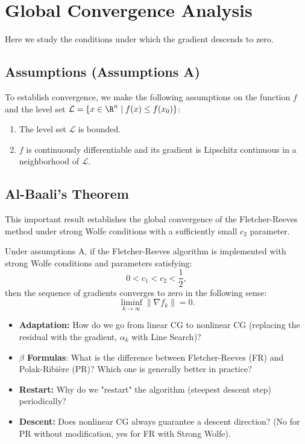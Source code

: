 \section{Global Convergence Analysis}

Here we study the conditions under which the gradient descends to zero.

\subsection{Assumptions (Assumptions A)}
To establish convergence, we make the following assumptions on the function $f$ and the level set $\mathcal{L} = \{x \in \R^n \mid f(x) \le f(x_0)\}$:
\begin{enumerate}
    \item The level set $\mathcal{L}$ is bounded.
    \item $f$ is continuously differentiable and its gradient is Lipschitz continuous in a neighborhood of $\mathcal{L}$.
\end{enumerate}

\subsection{Al-Baali's Theorem}

This important result establishes the global convergence of the Fletcher-Reeves method under strong Wolfe conditions with a sufficiently small $c_2$ parameter.

\begin{theoreme}[Al-Baali]
Under assumptions A, if the Fletcher-Reeves algorithm is implemented with strong Wolfe conditions and parameters satisfying:
\[
0 < c_1 < c_2 < \frac{1}{2},
\]
then the sequence of gradients converges to zero in the following sense:
\[
\liminf_{k \to \infty} \|\nabla f_k\| = 0.
\]
\end{theoreme}

\bigskip
\begin{checkpoint}
\begin{itemize}
    \item \textbf{Adaptation:} How do we go from linear CG to nonlinear CG (replacing the residual with the gradient, $\alpha_k$ with Line Search)?
    \item \textbf{$\beta$ Formulas}: What is the difference between Fletcher-Reeves (FR) and Polak-Ribière (PR)? Which one is generally better in practice?
    \item \textbf{Restart:} Why do we "restart" the algorithm (steepest descent step) periodically?
    \item \textbf{Descent:} Does nonlinear CG always guarantee a descent direction? (No for PR without modification, yes for FR with Strong Wolfe).
\end{itemize}
\end{checkpoint}
